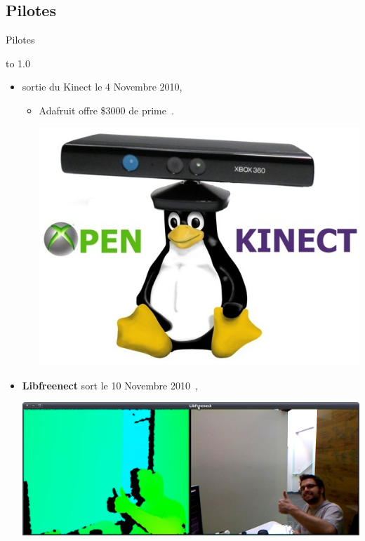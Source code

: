 \subsection{Pilotes}
\begin{frame}{Pilotes}

\vbox to 1.0\textheight
{
  \begin{itemize}
  \item sortie du Kinect le 4 Novembre 2010,
  \begin{itemize}
  \item Adafruit offre \$3000 de prime~\cite{adafruit_bounty}.
  
  {
  \vfill
  \begin{center}
  \includegraphics[width=0.65\textheight]{../images/kinect_tux}
  \end{center}
  }
  
  \end{itemize}
    \item<2-> \textbf{Libfreenect} sort le 10 Novembre 2010~\cite{adafruit_winner},
    
    {
    \vfill
    \begin{center}
    \includegraphics[width=0.9\linewidth]{../images/hector}
    \end{center}
    }
    

\end{itemize}}
\end{frame}
